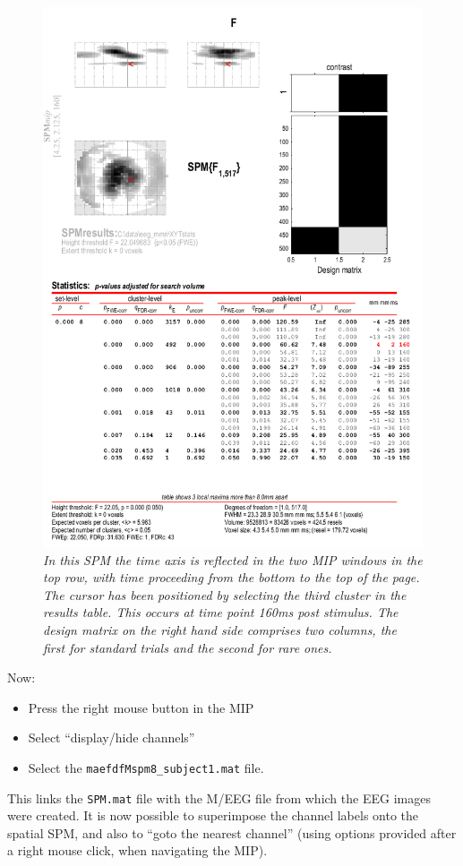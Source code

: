  \begin{figure}
\begin{center}
\includegraphics[width=120mm]{mmn/3DSPM}
\caption{\em In this SPM the time axis is reflected in the two MIP windows in the top row, with time proceeding from the bottom to the top of the page. The cursor has been positioned by selecting the third cluster in the results table. This occurs at time point 160ms post stimulus. The design matrix on the right hand side comprises two columns, the first for standard trials and the second for rare ones. \label{3DSPM}}
\end{center}
\end{figure}
Now:
\begin{itemize}
\item{Press the right mouse button in the MIP}
\item{Select ``display/hide channels''}
\item{Select the \texttt{maefdfMspm8\_subject1.mat} file.}
\end{itemize}
This links the \texttt{SPM.mat} file with the M/EEG file from which the EEG images were created.
It is now possible to superimpose the channel labels onto the spatial SPM, and also to ``goto the nearest channel'' (using options provided after a right mouse click, when navigating the MIP).

